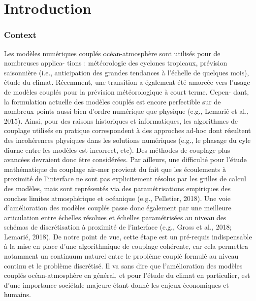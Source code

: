 \chapter*{Introduction}
\label{ch:introduction}
\subsection*{Context}
Les modèles numériques couplés océan-atmosphère sont utilisés pour de nombreuses applica-
tions : météorologie des cyclones tropicaux, prévision saisonnière (i.e., anticipation des grandes
tendances à l’échelle de quelques mois), étude du climat. Récemment, une transition a également
été amorcée vers l’usage de modèles couplés pour la prévision météorologique à court terme. Cepen-
dant, la formulation actuelle des modèles couplés est encore perfectible sur de nombreux points
aussi bien d’ordre numérique que physique (e.g., Lemarié et al., 2015).
Ainsi, pour des raisons historiques et informatiques, les algorithmes de couplage utilisés en
pratique correspondent à des approches ad-hoc dont résultent des incohérences physiques dans les
solutions numériques (e.g., le phasage du cyle diurne entre les modèles est incorrect, etc). Des
méthodes de couplage plus avancées devraient donc être considérées. Par ailleurs, une difficulté
pour l’étude mathématique du couplage air-mer provient du fait que les écoulements à proximité
de l’interface ne sont pas explicitement résolus par les grilles de calcul des modèles, mais sont
représentés via des paramétrisations empiriques des couches limites atmosphérique et océanique
(e.g., Pelletier, 2018). Une voie d’amélioration des modèles couplés passe donc également par une
meilleure articulation entre échelles résolues et échelles paramétrisées au niveau des schémas de
discrétisation à proximité de l’interface (e.g., Gross et al., 2018; Lemarié, 2018). De notre point de
vue, cette étape est un pré-requis indispensable à la mise en place d’une algorithmique de couplage
cohérente, car cela permettra notamment un continuum naturel entre le problème couplé formulé
au niveau continu et le problème discrétisé.
Il va sans dire que l’amélioration des modèles couplés océan-atmosphère en général, et pour
l’étude du climat en particulier, est d’une importance sociétale majeure étant donné les enjeux
économiques et humains.
